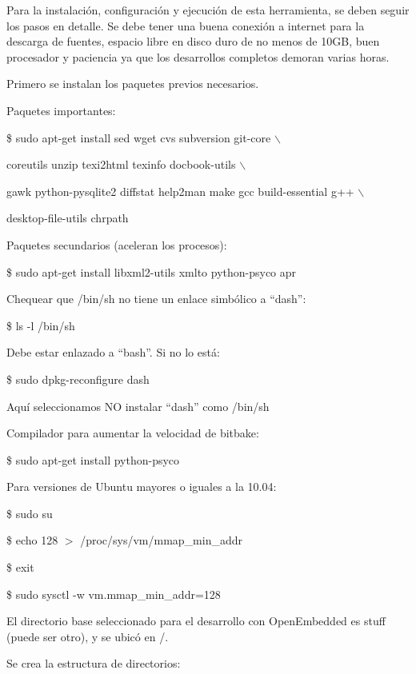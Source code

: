 Para la instalación, configuración y ejecución de esta herramienta, se deben seguir los pasos en detalle. Se debe tener una buena conexión a internet para la descarga de fuentes, espacio libre en disco duro de no menos de 10GB, buen procesador y paciencia ya que los desarrollos completos demoran varias horas.

\bigskip
Primero se instalan los paquetes previos necesarios. 

\bigskip
Paquetes importantes:

\bigskip
\centerline{\$ sudo apt-get install sed wget cvs subversion git-core $\backslash$}

\centerline{coreutils unzip texi2html texinfo docbook-utils $\backslash$}

\centerline{gawk python-pysqlite2 diffstat help2man make gcc build-essential g++ $\backslash$}

\centerline{desktop-file-utils chrpath}

\bigskip
Paquetes secundarios (aceleran los procesos):

\bigskip
\centerline{\$ sudo apt-get install libxml2-utils xmlto python-psyco apr}

\newpage
Chequear que /bin/sh no tiene un enlace simbólico a “dash”:

\bigskip
\centerline{\$ ls -l /bin/sh}

\bigskip
Debe estar enlazado a “bash”. Si no lo está:

\bigskip
\centerline{\$ sudo dpkg-reconfigure dash}

\bigskip
Aquí seleccionamos NO instalar “dash” como /bin/sh

\bigskip
Compilador para aumentar la velocidad de bitbake:

\bigskip
\centerline{\$ sudo apt-get install python-psyco}

\bigskip
Para versiones de Ubuntu mayores o iguales a la 10.04:

\bigskip
\centerline{\$ sudo su}

\centerline{\$ echo 128 $>$ /proc/sys/vm/mmap\_min\_addr}

\centerline{\$ exit}

\centerline{\$ sudo sysctl -w vm.mmap\_min\_addr=128}



\bigskip
El directorio base seleccionado para el desarrollo con OpenEmbedded es stuff (puede ser otro), y se ubicó en /.

\bigskip
Se crea la estructura de directorios:

